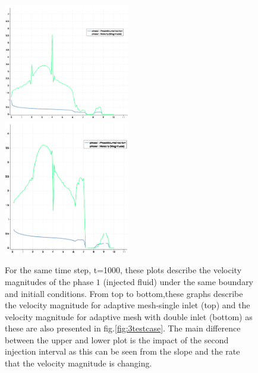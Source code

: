 \documentclass[preprint,authoryear,12pt]{elsarticle}
\begin{document}
{%
\begin{figure}
\begin{center}
\includegraphics[width=0.49\textwidth]{./Pics1/mr10_5regions_adapt/5regions_adapt_vel_magn.pdf}\\[2mm]%
\includegraphics[width=0.49\textwidth]{./Pics1/mr10_5regions_adapt_dinlet/5regions_dinlet_adapt_vel_magn.pdf}%
\caption{For the same time step, t=1000, these plots describe the velocity magnitudes of the phase $1$ (injected fluid) under the same boundary and initiall conditions. From top to bottom,these graphs describe the velocity magnitude %
for adaptive mesh-single inlet (top) and the velocity magnitude for adaptive mesh with double inlet (bottom) as these are also presented in fig.\ref{fig:3testcase}. The main difference between the upper and lower plot %
is the impact of the second injection interval as this can be seen from the slope and the rate that the velocity magnitude is changing.}
\label{fig:vel_magn2}
\end{center}
\end{figure}

}
\end{document}

